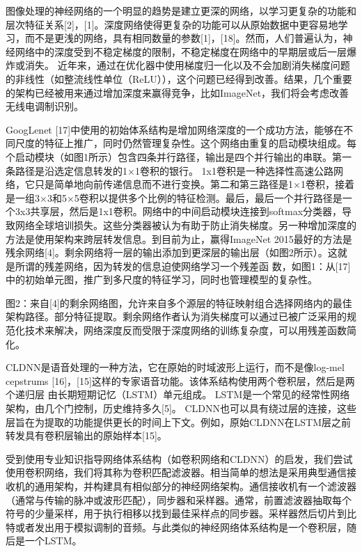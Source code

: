 图像处理的神经网络的一个明显的趋势是建立更深的网络，以学习更复杂的功能和层次特征关系[2]，[1]。深度网络使得更复杂的功能可以从原始数据中更容易地学习，而不是更浅的网络，具有相同数量的参数[1]，[18]。然而，人们普遍认为，神经网络中的深度受到不稳定梯度的限制，不稳定梯度在网络中的早期层或后一层爆炸或消失。
近年来，通过在优化器中使用梯度归一化以及不会加剧消失梯度问题的非线性（如整流线性单位（ReLU）），这个问题已经得到改善。结果，几个重要的架构已经被用来通过增加深度来赢得竞争，比如ImageNet，我们将会考虑改善无线电调制识别。\par

GoogLenet [17]中使用的初始体系结构是增加网络深度的一个成功方法，能够在不同尺度的特征上推广，同时仍然管理复杂性。这个网络由重复的启动模块组成。每个启动模块（如图1所示）包含四条并行路径，输出是四个并行输出的串联。第一条路径是沿选定信息转发的1×1卷积的银行。 1x1卷积是一种选择性高速公路网络，它只是简单地向前传递信息而不进行变换。第二和第三路径是1×1卷积，接着是一组3×3和5×5卷积以提供多个比例的特征检测。最后，最后一个并行路径是一个3x3共享层，然后是1x1卷积。网络中的中间启动模块连接到softmax分类器，导致网络全球培训损失。这些分类器被认为有助于防止消失梯度。另一种增加深度的方法是使用架构来跨层转发信息。到目前为止，赢得ImageNet 2015最好的方法是残余网络[4]。剩余网络将一层的输出添加到更深层的输出层（如图2所示）。这就是所谓的残差网络，因为转发的信息迫使网络学习一个残差函
数，如图1：从[17]中的初始单元图，推广到多尺度的特征学习，同时也管理模型的复杂性。\par

图2：来自[4]的剩余网络图，允许来自多个源层的特征映射组合选择网络内的最佳架构路径。部分特征提取。剩余网络作者认为消失梯度可以通过已被广泛采用的规范化技术来解决，网络深度反而受限于深度网络的训练复杂度，可以用残差函数简化。\par

CLDNN是语音处理的一种方法，它在原始的时域波形上运行，而不是像log-mel cepstrums [16]，[15]这样的专家语音功能。该体系结构使用两个卷积层，然后是两个递归层
由长期短期记忆（LSTM）单元组成。 LSTM是一个常见的经常性网络架构，由几个门控制，历史维持多久[5]。 CLDNN也可以具有绕过层的连接，这些层旨在为提取的功能提供更长的时间上下文。例如，原始CLDNN在LSTM层之前转发具有卷积层输出的原始样本[15]。\par

受到使用专业知识指导网络体系结构（如卷积网络和CLDNN）的启发，我们尝试使用卷积网络，我们将其称为卷积匹配滤波器。相当简单的想法是采用典型通信接收机的通用架构，并构建具有相似部分的神经网络架构。通信接收机有一个滤波器（通常与传输的脉冲或波形匹配），同步器和采样器。通常，前置滤波器抽取每个符号的少量采样，用于执行相移以找到最佳采样点的同步器。采样器然后切片到比特或者发出用于模拟调制的音频。与此类似的神经网络体系结构是一个卷积层，随后是一个LSTM。\par


